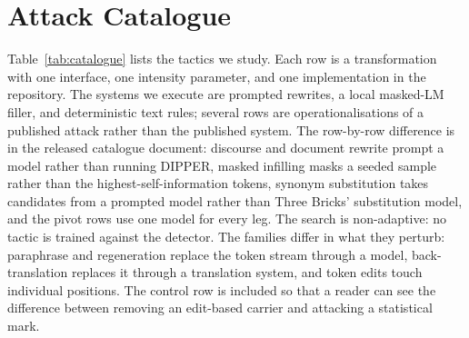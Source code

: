 \section{Attack Catalogue}
\label{sec:catalogue}

Table~\ref{tab:catalogue} lists the tactics we study. Each row is a transformation with one interface, one intensity parameter, and one implementation in the repository. The systems we execute are prompted rewrites, a local masked-LM filler, and deterministic text rules; several rows are operationalisations of a published attack rather than the published system. The row-by-row difference is in the released catalogue document: discourse and document rewrite prompt a model rather than running DIPPER, masked infilling masks a seeded sample rather than the highest-self-information tokens, synonym substitution takes candidates from a prompted model rather than Three Bricks' substitution model, and the pivot rows use one model for every leg. The search is non-adaptive: no tactic is trained against the detector. The families differ in what they perturb: paraphrase and regeneration replace the token stream through a model, back-translation replaces it through a translation system, and token edits touch individual positions. The control row is included so that a reader can see the difference between removing an edit-based carrier and attacking a statistical mark.

